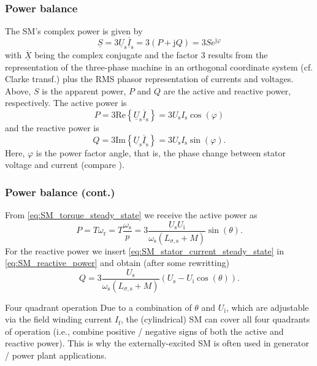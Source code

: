 \begin{frame}
	\frametitle{Power balance}
	The SM's complex power is given by
	\begin{equation}
		\underline{S}= 3\underline{U}_\mathrm{s} \overline{\underline{I}}_\mathrm{s} =  3(P + \mathrm{j}Q) = 3S e^{\mathrm{j}\varphi}
	\end{equation}
	with $\overline{\underline{X}}$ being the complex conjugate and the factor $3$ results from the representation of the three-phase machine in an orthogonal coordinate system (cf. Clarke transf.) plus the RMS phasor representation of currents and voltages. \pause Above, $S$ is the apparent power, $P$ and $Q$ are the active and reactive power, respectively. \pause The active power is
	\begin{equation}
		P = 3\mathrm{Re}\left\{ \underline{U}_\mathrm{s} \overline{\underline{I}}_\mathrm{s}\right\} = 3 U_\mathrm{s} I_\mathrm{s} \cos(\varphi)
	\end{equation}
	\pause
	and the reactive power is
	\begin{equation}
		Q = 3\mathrm{Im}\left\{\underline{U}_\mathrm{s} \overline{\underline{I}}_\mathrm{s}\right\} = 3 U_\mathrm{s} I_\mathrm{s} \sin(\varphi).
		\label{eq:SM_reactive_power}
	\end{equation}
	\pause
	Here, $\varphi$ is the power factor angle, that is, the phase change between stator voltage and current (compare ).
\end{frame}

\begin{frame}
	\frametitle{Power balance (cont.)}
	From \eqref{eq:SM_torque_steady_state} we receive the active power as
	\begin{equation}
		P = T \omega_\mathrm{r} = T \frac{\omega_\mathrm{s}}{p} = 3 \frac{U_\mathrm{s} U_\mathrm{i}}{\omega_\mathrm{s} \left(L_{\sigma,\mathrm{s}} + M\right)}  \sin(\theta).
	\end{equation}
	\pause
	For the reactive power we insert \eqref{eq:SM_stator_current_steady_state} in \eqref{eq:SM_reactive_power} and obtain (after some rewritting)
	\begin{equation}
		Q = 3 \frac{U_\mathrm{s}}{\omega_\mathrm{s} \left(L_{\sigma,\mathrm{s}} + M\right)} \left(U_\mathrm{s} - U_\mathrm{i} \cos(\theta) \right).
	\end{equation}
	\pause
	\begin{varblock}{Four quadrant operation}
		Due to a combination of $\theta$ and $U_\mathrm{i}$, which are adjustable via the field winding current $I_\mathrm{f}$, the (cylindrical) SM can cover all four quadrants of operation (i.e., combine positive / negative signs of both the active and reactive power). This is why the externally-excited SM is often used in generator / power plant applications.
	\end{varblock}
\end{frame}

